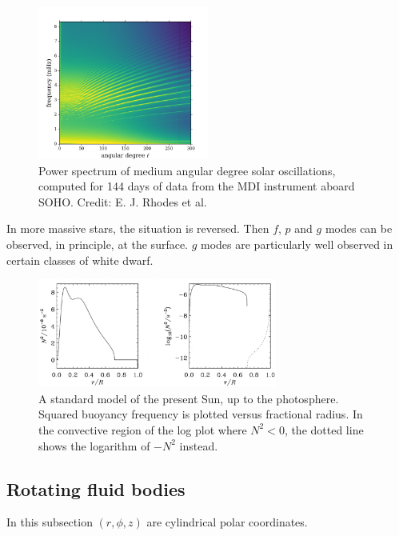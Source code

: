 \documentclass{jknotes}
\begin{document}
\begin{figure}[h]
	\centering
	\includegraphics[width=0.5\textwidth]{helio.png}
	\caption{Power spectrum of medium angular degree solar oscillations,
		computed for 144 days of data from the MDI instrument aboard SOHO.
	Credit: E. J. Rhodes et al.}
	\label{fig:rhodes}
\end{figure}

In more massive stars, the situation is reversed. Then $f$, $p$ and $g$ modes
can be observed, in principle, at the surface. $g$ modes are particularly well
observed in certain classes of white dwarf.

\begin{figure}[h]
	\centering
	\includegraphics[width=0.7\textwidth]{nsquared.png}
	\caption{A standard model of the present Sun, up to the photosphere.
	Squared buoyancy frequency is plotted versus fractional radius. In the
	convective region of the log plot where $N^2 < 0$, the dotted line shows the
	logarithm of $-N^2$ instead.}
	\label{fig:nsquared}
\end{figure}

\subsection{Rotating fluid bodies}
In this subsection $(r,\phi,z)$ are cylindrical polar coordinates.
\end{document}
